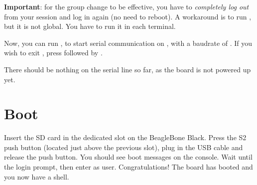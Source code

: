 {\bf Important}: for the group change to be effective, you have to
{\em completely log out} from your session and log in again (no need to
reboot). A workaround is to run , but it is not global.
You have to run it in each terminal.

Now, you can run , to start serial
communication on , with a baudrate of .
If you wish to exit , press \code{[Ctrl][a]} followed by
\code{[Ctrl][x]}.

There should be nothing on the serial line so far, as the board is not
powered up yet.

\section{Boot}

Insert the SD card in the dedicated slot on the BeagleBone Black. Press the S2
push button (located just above the previous slot), plug in the USB cable and
release the push button.
You should see boot messages on the console.
Wait until the login prompt, then enter  as user.
Congratulations! The board has booted and you now have a shell.
